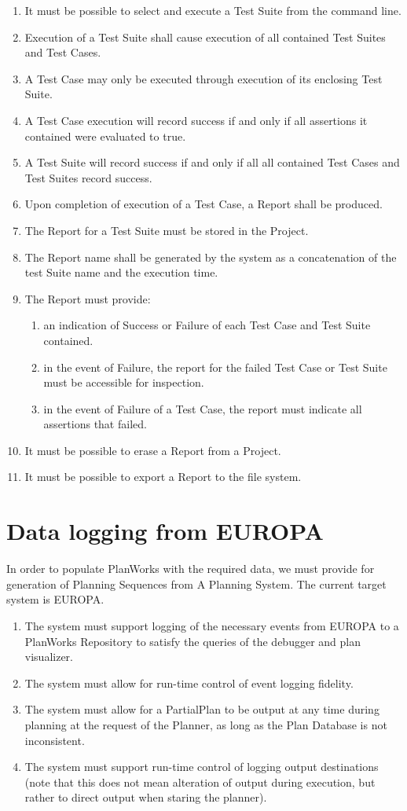 \documentclass[twoside, 11pt]{article}
\begin{document}
\begin{enumerate}
\item It must be possible to select and execute a Test Suite from the command line.
\item Execution of a Test Suite shall cause execution of all contained Test Suites and Test Cases.
\item A Test Case may only be executed through execution of its enclosing Test Suite.
\item A Test Case execution will record success if and only if all assertions it contained were evaluated to true.
\item A Test Suite will record success if and only if all all contained Test Cases and Test Suites record success.
\item Upon completion of execution of a Test Case, a Report shall be produced.
\item The Report for a Test Suite must be stored in the Project.
\item The Report name shall be generated by the system as a concatenation of the test Suite name and the execution time.
\item The Report must provide:
\begin{enumerate}
\item an indication of Success or Failure of each Test Case and Test Suite contained.
\item in the event of Failure, the report for the failed Test Case or Test Suite must be accessible for inspection.
\item in the event of Failure of a Test Case, the report must indicate all assertions that failed.
\end{enumerate}
\item It must be possible to erase a Report from a Project.
\item It must be possible to export a Report to the file system.
\end{enumerate}

\section{Data logging from EUROPA}
In order to populate PlanWorks with the required data, we must provide for generation of Planning Sequences from A Planning System. The current target system is EUROPA.
\begin{enumerate}
\item The system must support logging of the necessary events from EUROPA to a PlanWorks Repository to satisfy the queries of the debugger and plan visualizer.
\item The system must allow for run-time control of event logging fidelity.
\item The system must allow for a PartialPlan to be output at any time during planning at the request of the Planner, as long as the Plan Database is not inconsistent.
\item The system must support run-time control of logging output destinations (note that this does not mean alteration of output during execution, but rather to direct output when staring the planner).
\end{enumerate}
\end{document}
